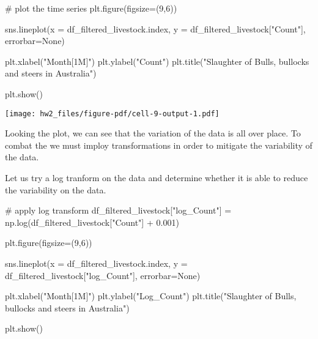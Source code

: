 \documentclass[
  11pt,
]{article}
\newenvironment{Shaded}{\begin{snugshade}}{\end{snugshade}}
\newcommand{\CommentTok}[1]{\textcolor[rgb]{0.37,0.37,0.37}{#1}}
\newcommand{\DecValTok}[1]{\textcolor[rgb]{0.68,0.00,0.00}{#1}}
\newcommand{\FloatTok}[1]{\textcolor[rgb]{0.68,0.00,0.00}{#1}}
\newcommand{\NormalTok}[1]{\textcolor[rgb]{0.00,0.23,0.31}{#1}}
\newcommand{\OperatorTok}[1]{\textcolor[rgb]{0.37,0.37,0.37}{#1}}
\newcommand{\StringTok}[1]{\textcolor[rgb]{0.13,0.47,0.30}{#1}}
\newcommand{\VariableTok}[1]{\textcolor[rgb]{0.07,0.07,0.07}{#1}}
\begin{document}
\begin{Shaded}
\begin{Highlighting}[]
\CommentTok{\# plot the time series}
\NormalTok{plt.figure(figsize}\OperatorTok{=}\NormalTok{(}\DecValTok{9}\NormalTok{,}\DecValTok{6}\NormalTok{))}

\NormalTok{sns.lineplot(x }\OperatorTok{=}\NormalTok{ df\_filtered\_livestock.index, }
\NormalTok{             y }\OperatorTok{=}\NormalTok{ df\_filtered\_livestock[}\StringTok{"Count"}\NormalTok{],}
\NormalTok{             errorbar}\OperatorTok{=}\VariableTok{None}\NormalTok{)}

\NormalTok{plt.xlabel(}\StringTok{"Month[1M]"}\NormalTok{)}
\NormalTok{plt.ylabel(}\StringTok{"Count"}\NormalTok{)}
\NormalTok{plt.title(}\StringTok{"Slaughter of Bulls, bullocks and steers in Australia"}\NormalTok{)}

\NormalTok{plt.show()}
\end{Highlighting}
\end{Shaded}

\texttt{[image: hw2\_files/figure-pdf/cell-9-output-1.pdf]}

Looking the plot, we can see that the variation of the data is all over
place. To combat the we must imploy transformations in order to mitigate
the variability of the data.

Let us try a log tranform on the data and determine whether it is able
to reduce the variability on the data.

\begin{Shaded}
\begin{Highlighting}[]
\CommentTok{\# apply log transform}
\NormalTok{df\_filtered\_livestock[}\StringTok{"log\_Count"}\NormalTok{] }\OperatorTok{=}\NormalTok{ np.log(df\_filtered\_livestock[}\StringTok{"Count"}\NormalTok{] }\OperatorTok{+} \FloatTok{0.001}\NormalTok{)}
\end{Highlighting}
\end{Shaded}

\begin{Shaded}
\begin{Highlighting}[]
\NormalTok{plt.figure(figsize}\OperatorTok{=}\NormalTok{(}\DecValTok{9}\NormalTok{,}\DecValTok{6}\NormalTok{))}

\NormalTok{sns.lineplot(x }\OperatorTok{=}\NormalTok{ df\_filtered\_livestock.index, }
\NormalTok{             y }\OperatorTok{=}\NormalTok{ df\_filtered\_livestock[}\StringTok{"log\_Count"}\NormalTok{],}
\NormalTok{             errorbar}\OperatorTok{=}\VariableTok{None}\NormalTok{)}

\NormalTok{plt.xlabel(}\StringTok{"Month[1M]"}\NormalTok{)}
\NormalTok{plt.ylabel(}\StringTok{"Log\_Count"}\NormalTok{)}
\NormalTok{plt.title(}\StringTok{"Slaughter of Bulls, bullocks and steers in Australia"}\NormalTok{)}

\NormalTok{plt.show()}
\end{Highlighting}
\end{Shaded}
\end{document}
